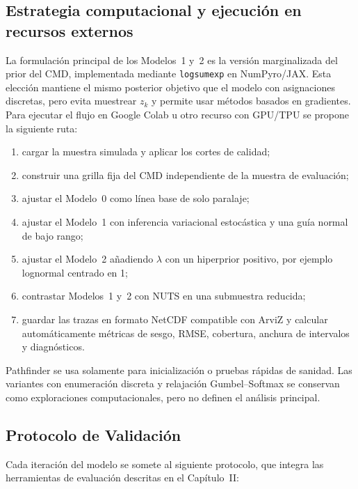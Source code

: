 \documentclass[stu, 12pt, letterpaper, donotrepeattitle, floatsintext, natbib]{apa7_ula}
\begin{document}
\subsection{Estrategia computacional y ejecución en recursos externos}

La formulación principal de los Modelos~1 y~2 es la versión
marginalizada del prior del CMD, implementada mediante \texttt{logsumexp}
en NumPyro/JAX. Esta elección mantiene el mismo posterior objetivo que
el modelo con asignaciones discretas, pero evita muestrear $z_k$ y
permite usar métodos basados en gradientes. Para ejecutar el flujo en
Google Colab u otro recurso con GPU/TPU se propone la siguiente ruta:

\begin{enumerate}
    \item cargar la muestra simulada y aplicar los cortes de calidad;
    \item construir una grilla fija del CMD independiente de la muestra
    de evaluación;
    \item ajustar el Modelo~0 como línea base de solo paralaje;
    \item ajustar el Modelo~1 con inferencia variacional estocástica y
    una guía normal de bajo rango;
    \item ajustar el Modelo~2 añadiendo $\lambda$ con un hiperprior
    positivo, por ejemplo lognormal centrado en 1;
    \item contrastar Modelos~1 y~2 con NUTS en una submuestra reducida;
    \item guardar las trazas en formato NetCDF compatible con ArviZ y
    calcular automáticamente métricas de sesgo, RMSE, cobertura,
    anchura de intervalos y diagnósticos.
\end{enumerate}

Pathfinder se usa solamente para inicialización o pruebas rápidas de
sanidad. Las variantes con enumeración discreta y relajación
Gumbel--Softmax se conservan como exploraciones computacionales, pero
no definen el análisis principal.

\subsection{Protocolo de Validación}

Cada iteración del modelo se somete al siguiente protocolo, que
integra las herramientas de evaluación descritas en el Capítulo~II:
\end{document}
